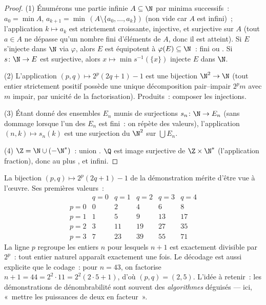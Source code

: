 \begin{proof}
(1) Énumérons une partie infinie $A \subseteq \N$ par minima
successifs~: $a_0 = \min A$, $a_{k+1} = \min\,(A \setminus \{a_0, \dots,
a_k\})$ (non vide car $A$ est infini)~; l'application $k \mapsto a_k$
est strictement croissante, injective, et surjective sur $A$ (tout $a
\in A$ ne dépasse qu'un nombre fini d'éléments de $A$, donc il est
atteint). Si $E$ s'injecte dans $\N$ via $\varphi$, alors $E$ est
équipotent à $\varphi(E) \subseteq \N$~: fini ou . Si $s
\colon \N \to E$ est surjective, alors $x \mapsto \min s^{-1}(\{x\})$
injecte $E$ dans $\N$.

(2) L'application $(p, q) \mapsto 2^p(2q + 1) - 1$ est une bijection
$\N^2 \to \N$ (tout entier strictement positif possède une unique
décomposition pair--impair $2^p m$ avec $m$ impair, par unicité de la
factorisation). Produits~: composer les injections.

(3) Étant donné des ensembles $E_n$ munis de surjections $s_n \colon \N
\to E_n$ (sans dommage lorsque l'un des $E_n$ est fini~: on répète des
valeurs), l'application $(n, k) \mapsto s_n(k)$ est une surjection du
 $\N^2$ sur $\bigcup E_n$.

(4) $\Z = \N \cup (-\N^*)$~: union . $\Q$ est image
surjective de $\Z \times \N^*$ (l'application fraction), donc au plus
, et infini.
\end{proof}

\begin{example}\label{ex:b2:structures:pairing}
La bijection $(p, q) \mapsto 2^p(2q + 1) - 1$ de la démonstration
mérite d'être vue à l'œuvre. Ses premières valeurs~:
\[
\begin{array}{c|ccccc}
 & q = 0 & q = 1 & q = 2 & q = 3 & q = 4\\
\hline
p = 0 & 0 & 2 & 4 & 6 & 8\\
p = 1 & 1 & 5 & 9 & 13 & 17\\
p = 2 & 3 & 11 & 19 & 27 & 35\\
p = 3 & 7 & 23 & 39 & 55 & 71
\end{array}
\]
La ligne $p$ regroupe les entiers $n$ pour lesquels $n + 1$ est
exactement divisible par $2^p$~: tout entier naturel apparaît
exactement une fois. Le décodage est aussi explicite que le
codage~: pour $n = 43$, on factorise $n + 1
= 44 = 2^2\cdot 11 = 2^2(2\cdot5 + 1)$, d'où $(p, q) = (2, 5)$.
L'idée à retenir~: les démonstrations de dénombrabilité sont
souvent des \emph{algorithmes} déguisés --- ici, «~mettre les
puissances de deux en facteur~».
\end{example}

